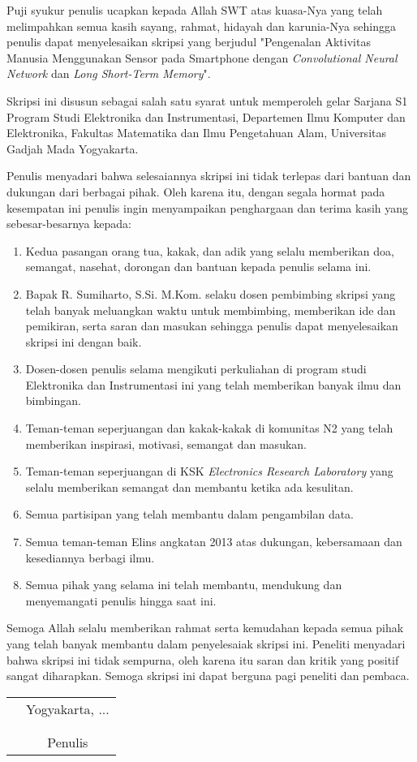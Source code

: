 \preface
Puji syukur penulis ucapkan kepada Allah SWT atas kuasa-Nya yang telah melimpahkan semua kasih sayang, rahmat, hidayah dan karunia-Nya sehingga penulis dapat menyelesaikan skripsi yang berjudul "Pengenalan Aktivitas Manusia Menggunakan Sensor pada Smartphone dengan \textit{Convolutional Neural Network} dan \textit{Long Short-Term Memory}".

Skripsi ini disusun sebagai salah satu syarat untuk memperoleh gelar Sarjana S1 Program Studi Elektronika dan Instrumentasi, Departemen Ilmu Komputer dan Elektronika, Fakultas Matematika dan Ilmu Pengetahuan Alam, Universitas Gadjah Mada Yogyakarta.

Penulis menyadari bahwa selesaiannya skripsi ini tidak terlepas dari bantuan dan dukungan dari berbagai pihak. Oleh karena itu, dengan segala hormat pada kesempatan ini penulis ingin menyampaikan penghargaan dan terima kasih yang sebesar-besarnya kepada:

\begin{enumerate}
    \item Kedua pasangan orang tua, kakak, dan adik yang selalu memberikan doa, semangat, nasehat, dorongan dan bantuan kepada penulis selama ini.
    \item Bapak R. Sumiharto, S.Si. M.Kom. selaku dosen pembimbing skripsi yang telah banyak meluangkan waktu untuk membimbing, memberikan ide dan pemikiran, serta saran dan masukan sehingga penulis dapat menyelesaikan skripsi ini dengan baik.
    \item Dosen-dosen penulis selama mengikuti perkuliahan di program studi Elektronika dan Instrumentasi ini yang telah memberikan banyak ilmu dan bimbingan.
    \item Teman-teman seperjuangan dan kakak-kakak di komunitas N2 yang telah memberikan inspirasi, motivasi, semangat 
    dan masukan.
    \item Teman-teman seperjuangan di KSK \textit{Electronics Research Laboratory} yang selalu memberikan semangat dan membantu ketika ada kesulitan.
    \item Semua partisipan yang telah membantu dalam pengambilan data.
    \item Semua teman-teman Elins angkatan 2013 atas dukungan, kebersamaan dan kesediannya berbagi ilmu.
    \item Semua pihak yang selama ini telah membantu, mendukung dan menyemangati penulis hingga saat ini.
\end{enumerate}

Semoga Allah selalu memberikan rahmat serta kemudahan kepada semua pihak yang telah banyak membantu dalam penyelesaiak skripsi ini. Peneliti menyadari bahwa skripsi ini tidak sempurna, oleh karena itu saran dan kritik yang positif sangat diharapkan. Semoga skripsi ini dapat berguna pagi peneliti dan pembaca.

\vspace{1.5cm}
\begin{tabular}{p{7.5cm}c}
&Yogyakarta, ...\\
&\\
&\\
&Penulis
\end{tabular}
\vfill
